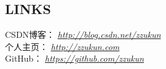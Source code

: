 \documentclass[line, margin]{res}
\begin{document}
\begin{resume}
\vspace {30pt}
\section {LINKS}
{ CSDN博客：} {\sl \url{http://blog.csdn.net/zzukun}}\\
[3pt]
{ 个人主页：} {\sl \url{http://zzukun.com}}\\
[3pt]
{ GitHub：  } {\sl \url{https://github.com/zzukun}}\\

\end{resume}
\end{document}
